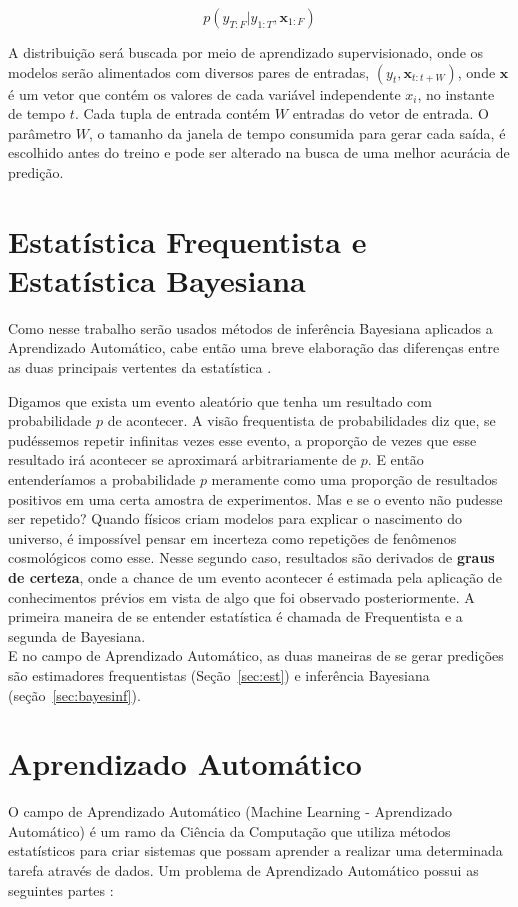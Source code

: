 \[ p(y_{T:F} | y_{1:T},\textbf{x}_{{1}:F}) \]

A distribuição será buscada por meio de aprendizado supervisionado, onde os
modelos serão alimentados com diversos pares de entradas,
$(y_t,\textbf{x}_{t:t+W})$, onde $\textbf{x}$ é um vetor que contém os valores de
cada variável independente $x_i$, no instante de tempo $t$. Cada tupla de
entrada contém $W$ entradas do vetor de entrada. O parâmetro $W$, o
tamanho da janela de tempo consumida para gerar cada saída, é escolhido antes do
treino e pode ser alterado na busca de uma melhor acurácia de predição.



\section{Estatística Frequentista e Estatística Bayesiana}
 
Como nesse trabalho serão usados métodos de inferência Bayesiana aplicados a Aprendizado Automático,
cabe então uma breve elaboração das diferenças entre as duas principais
vertentes da estatística \citep{dlbook}. 

Digamos que exista um evento aleatório que tenha um resultado com probabilidade
$p$ de acontecer. A visão frequentista de probabilidades diz que, se pudéssemos
repetir infinitas vezes esse evento, a proporção de vezes que esse resultado irá
acontecer se aproximará arbitrariamente de $p$. E então entenderíamos a
probabilidade $p$ meramente como uma proporção de resultados positivos em uma
certa amostra de experimentos. Mas e se o evento não pudesse ser repetido?
Quando físicos criam modelos para explicar o nascimento do universo, é
impossível pensar em incerteza como repetições de fenômenos cosmológicos como esse. Nesse segundo caso, resultados são derivados de \textbf{graus de certeza}, onde a chance de um evento acontecer é estimada pela aplicação de conhecimentos prévios em vista de algo que foi observado posteriormente. A primeira maneira de se entender estatística é chamada de Frequentista e a segunda de Bayesiana. \\

E no campo de Aprendizado Automático, as duas maneiras de se gerar predições são estimadores
frequentistas (Seção~\ref{sec:est}) e inferência Bayesiana (seção~\ref{sec:bayesinf}).



\section{Aprendizado Automático}
\label{sec:aprenauto}
O campo de Aprendizado Automático (Machine Learning - Aprendizado Automático) é um ramo da Ciência
da Computação que utiliza métodos estatísticos para criar sistemas que possam
aprender a realizar uma determinada tarefa através de dados. Um problema de Aprendizado Automático possui
as seguintes partes \citep{dlbook}: \\

